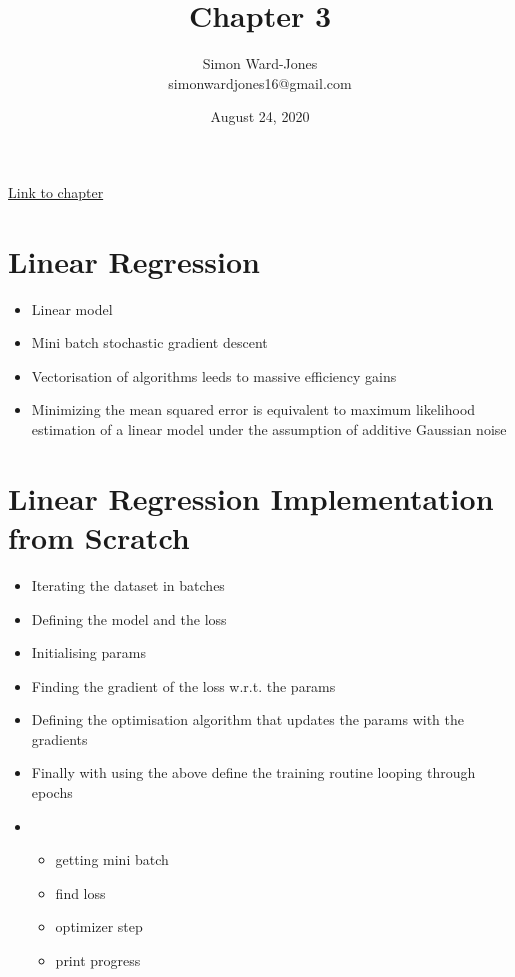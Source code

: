 \documentclass[12pt,notitlepage]{article}
\begin{document}


\title{\Large{\textbf{Chapter 3}}}
\date{August 24, 2020}
\author{Simon Ward-Jones\\simonwardjones16@gmail.com}

\maketitle
\href{https://d2l.ai/chapter_linear-networks/linear-regression.html}{Link to chapter}

\section{Linear Regression}
\begin{itemize}
    \item Linear model
    \item Mini batch stochastic gradient descent
    \item Vectorisation of algorithms leeds to massive efficiency gains
    \item Minimizing the mean squared error is equivalent to maximum likelihood estimation of a linear model under the assumption of additive Gaussian noise
\end{itemize}

\section{Linear Regression Implementation from Scratch}
\begin{itemize}
    \item Iterating the dataset in batches
    \item Defining the model and the loss
    \item Initialising params
    \item Finding the gradient of the loss w.r.t. the params
    \item Defining the optimisation algorithm that updates the params with the gradients
    \item Finally with using the above define the training routine looping through epochs
    \item \begin{itemize}
        \item getting mini batch
        \item find loss
        \item optimizer step
        \item print progress
    \end{itemize}
\end{itemize}
\end{document}
